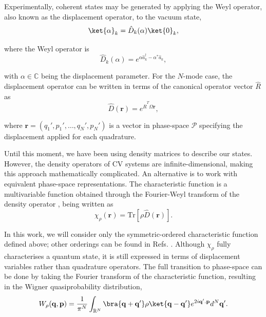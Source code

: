 \noindent Experimentally, coherent states may be generated by applying the Weyl operator, also known as the displacement operator, to the vacuum state,
\begin{equation}
    \ket{\alpha}_k = \hat{D}_k (\alpha) \ket{0}_k,
\end{equation}

\noindent where the Weyl operator is
\begin{equation}
    \hat{D}_k (\alpha) = e^{\alpha \hat{a}_k^\dagger - \alpha^* \hat{a}_k},
    \label{eq:displacement-single-mode}
\end{equation}

\noindent with $\alpha \in \mathbb{C}$ being the displacement parameter. For the $N$-mode case, the displacement operator can be written in terms of the canonical operator vector $\hat{R}$ as
\begin{equation}
    \hat{D}(\mathbf{r}) = e^{\hat{R}^T \Omega \mathbf{r}},
\end{equation}

\noindent where $\mathbf{r} = (q_1', p_1', \dots, q_N', p_N')$ is a vector in phase-space $\mathcal{P}$ specifying the displacement applied for each quadrature.

Until this moment, we have been using density matrices to describe our states. However, the density operators of CV systems are infinite-dimensional, making this approach mathematically complicated. An alternative is to work with equivalent phase-space representations. The characteristic function is a multivariable function obtained through the Fourier-Weyl transform of the density operator \cite{serafini-book}, being written as
\begin{equation}
    \chi_\rho (\mathbf{r}) = \text{Tr} [\rho \hat{D}(\mathbf{r})].
\end{equation}

\noindent In this work, we will consider only the symmetric-ordered characteristic function defined above; other orderings can be found in Refs. \cite{gerardo-2014, serafini-book}. Although $\chi_\rho$ fully characterises a quantum state, it is still expressed in terms of displacement variables rather than quadrature operators. The full transition to phase-space can be done by taking the Fourier transform of the characteristic function, resulting in the Wigner quasiprobability distribution,
\begin{equation}
    W_\rho (\mathbf{q}, \mathbf{p}) = \frac{1}{\pi^N} \int_{\mathbb{R}^{N}} \bra{\mathbf{q} + \mathbf{q'}} \rho \ket{\mathbf{q} - \mathbf{q'}} e^{2i \mathbf{q'.p}} d^N \mathbf{q'}.
\end{equation}

